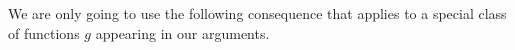 \documentclass[11pt]{amsart}
\newtheorem{theorem}[lemma]{Theorem}
\newtheorem{corollary}[lemma]{Corollary}
\theoremstyle{definition}
\newcommand{\N}{{\mathbb N}}
\newcommand{\R}{{\mathbb R}}
\begin{document}
 	
 We are only going to use the following consequence that applies to a special class of functions $g$
  appearing in our arguments.
 	
 	
\end{document}
